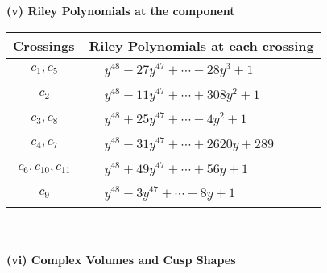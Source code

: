 \documentclass[1p]{elsarticle_modified}
\theoremstyle{definition}
\begin{document}
\newpage\renewcommand{\arraystretch}{1}
\flushleft \textbf{(v) Riley Polynomials at the component}\newline \\
\begin{tabular}{m{50pt}|m{274pt}}
Crossings & \hspace{64pt}Riley Polynomials at each crossing \\
\hline $$\begin{aligned}c_{1},c_{5}\end{aligned}$$&$\begin{aligned}
&y^{48}-27 y^{47}+\cdots-28 y^3+1
\end{aligned}$\\
\hline $$\begin{aligned}c_{2}\end{aligned}$$&$\begin{aligned}
&y^{48}-11 y^{47}+\cdots+308 y^2+1
\end{aligned}$\\
\hline $$\begin{aligned}c_{3},c_{8}\end{aligned}$$&$\begin{aligned}
&y^{48}+25 y^{47}+\cdots-4 y^2+1
\end{aligned}$\\
\hline $$\begin{aligned}c_{4},c_{7}\end{aligned}$$&$\begin{aligned}
&y^{48}-31 y^{47}+\cdots+2620 y+289
\end{aligned}$\\
\hline $$\begin{aligned}c_{6},c_{10},c_{11}\end{aligned}$$&$\begin{aligned}
&y^{48}+49 y^{47}+\cdots+56 y+1
\end{aligned}$\\
\hline $$\begin{aligned}c_{9}\end{aligned}$$&$\begin{aligned}
&y^{48}-3 y^{47}+\cdots-8 y+1
\end{aligned}$\\
\hline
\end{tabular}\\~\\
\newpage\flushleft \textbf{(vi) Complex Volumes and Cusp Shapes}
\end{document}
